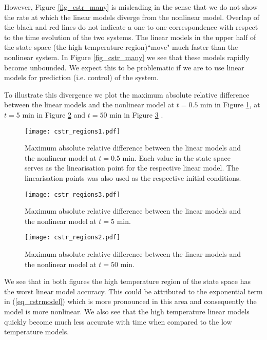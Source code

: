 However, Figure \ref{fig_cstr_many} is misleading in the sense that we do not show the rate at which the linear models diverge from the nonlinear model. Overlap of the black and red lines do not indicate a one to one correspondence with respect to the time evolution of the two systems. The linear models in the upper half of the state space (the high temperature region)``move" much faster than the nonlinear system. In Figure \ref{fig_cstr_many} we see that these models rapidly become unbounded. We expect this to be problematic if we are to use linear models for prediction (i.e. control) of the system.

To illustrate this divergence we plot the maximum absolute relative difference between the linear models and the nonlinear model at $t = 0.5$ min in Figure \ref{fig_cstr_regions1}, at $t = 5$ min in Figure \ref{fig_cstr_regions2} and $t = 50$ min in Figure \ref{fig_cstr_regions3} . 
\begin{figure}[H] 
\centering
\texttt{[image: cstr\_regions1.pdf]}
\caption{Maximum absolute relative difference between the linear models and the nonlinear model at $t=0.5$ min. Each value in the state space serves as the linearisation point for the respective linear model. The linearisation points was also used as the respective initial conditions.}
\label{fig_cstr_regions1}
\end{figure}
\begin{figure}[H] 
\centering
\texttt{[image: cstr\_regions3.pdf]} %
\caption{Maximum absolute relative difference between the linear models and the nonlinear model at $t=5$ min.}
\label{fig_cstr_regions2}
\end{figure}
\begin{figure}[H] 
\centering
\texttt{[image: cstr\_regions2.pdf]} %
\caption{Maximum absolute relative difference between the linear models and the nonlinear model at $t=50$ min.}
\label{fig_cstr_regions3}
\end{figure}
We see that in both figures the high temperature region of the state space has the worst linear model accuracy. This could be attributed to the exponential term in (\ref{eq_cstrmodel}) which is more pronounced in this area and consequently the model is more nonlinear. We also see that the high temperature linear models quickly become much less accurate with time when compared to the low temperature models.
